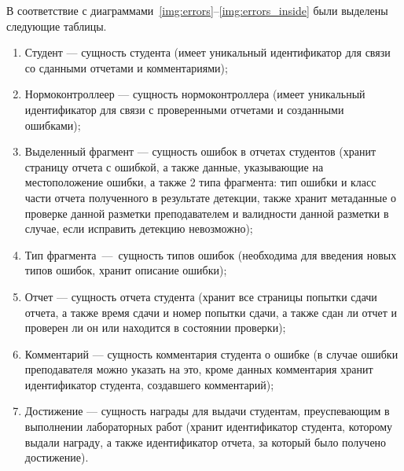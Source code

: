 В соответствие с диаграммами~\ref{img:errors}--\ref{img:errors_inside} были выделены следующие таблицы.
\begin{enumerate}
	\item Студент --- сущность студента (имеет уникальный идентификатор для связи со сданными отчетами и комментариями);
	\item Нормоконтроллеер --- сущность нормоконтроллера (имеет уникальный идентификатор для связи с проверенными отчетами и созданными ошибками);
	\item Выделенный фрагмент --- сущность ошибок в отчетах студентов (хранит страницу отчета с ошибкой, а также данные, указывающие на местоположение ошибки, а также 2 типа фрагмента: тип ошибки и класс части отчета полученного в результате детекции, также хранит метаданные о проверке данной разметки преподавателем и валидности данной разметки в случае, если исправить детекцию невозможно);
	\item Тип фрагмента~---~сущность типов ошибок (необходима для введения новых типов ошибок, хранит описание ошибки);
	\item Отчет --- сущность отчета студента (хранит все страницы попытки сдачи отчета, а также время сдачи и номер попытки сдачи, а также сдан ли отчет и проверен ли он или находится в состоянии проверки);
	\item Комментарий --- сущность комментария студента о ошибке (в случае ошибки преподавателя можно указать на это, кроме данных комментария хранит идентификатор студента, создавшего комментарий);
	\item Достижение --- сущность награды для выдачи студентам, преуспевающим в выполнении лабораторных работ (хранит идентификатор студента, которому выдали награду, а также идентификатор отчета, за который было получено достижение).
\end{enumerate}

